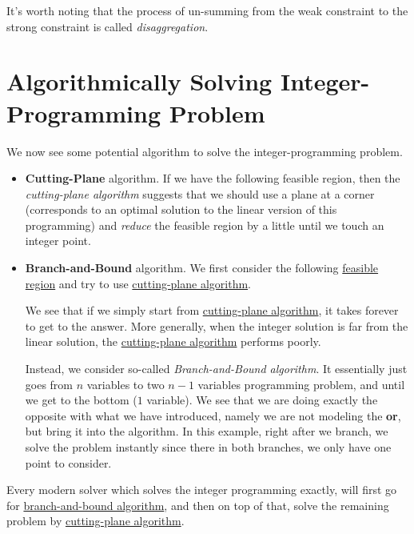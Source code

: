 \begin{note}[Disaggregation]
	It's worth noting that the process of un-summing from the weak constraint to the strong constraint is called \emph{disaggregation}.
\end{note}

\section{Algorithmically Solving Integer-Programming Problem}
We now see some potential algorithm to solve the integer-programming problem.
\begin{itemize}
	\item \label{eg:cutting-plane}\textbf{Cutting-Plane} algorithm. If we have the following feasible region, then the \emph{cutting-plane algorithm} suggests
	      that we should use a plane at a corner (corresponds to an optimal solution to the linear version of this programming) and
	      \emph{reduce} the feasible region by a little until we touch an integer point.
	      \begin{center}
	      \end{center}
	\item \label{eg:branch-and-bound}\textbf{Branch-and-Bound} algorithm. We first consider the following \hyperref[def:feasible-region]{feasible region}
	      and try to use \hyperref[eg:cutting-plane]{cutting-plane algorithm}.
	      \begin{center}
	      \end{center}
	      We see that if we simply start from \hyperref[eg:cutting-plane]{cutting-plane algorithm}, it takes forever to get to the answer. More generally, when the
	      integer solution is far from the linear solution, the \hyperref[eg:cutting-plane]{cutting-plane algorithm} performs poorly.

	      \par Instead, we consider so-called \emph{Branch-and-Bound algorithm}. It essentially just goes from \(n\) variables to two \(n-1\) variables
	      programming problem, and until we get to the bottom (\(1\) variable). We see that we are doing exactly the opposite with what we have
	      introduced, namely we are not modeling the \textbf{or}, but bring it into the algorithm. In this example, right after we branch,
	      we solve the problem instantly since there in both branches, we only have one point to consider.
\end{itemize}
\begin{note}
	Every modern solver which solves the integer programming exactly, will first go for \hyperref[eg:branch-and-bound]{branch-and-bound algorithm}, and then on top
	of that, solve the remaining problem by \hyperref[eg:cutting-plane]{cutting-plane algorithm}.
\end{note}